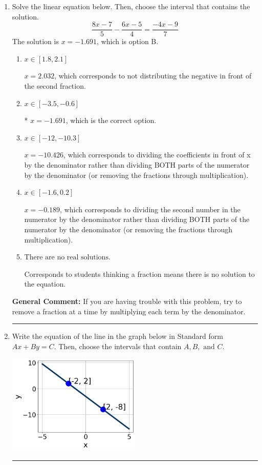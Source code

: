 \documentclass{extbook}[14pt]
\newcommand{\litem}[1]{\item #1

\rule{\textwidth}{0.4pt}}
\begin{document}
\begin{enumerate}\litem{
Solve the linear equation below. Then, choose the interval that contains the solution.
\[ \frac{8x -7}{5} - \frac{6x -5}{4} = \frac{-4x -9}{7} \]The solution is \( x = -1.691 \), which is option B.\begin{enumerate}[label=\Alph*.]
\item \( x \in [1.8, 2.1] \)

 $x = 2.032$, which corresponds to not distributing the negative in front of the second fraction.
\item \( x \in [-3.5, -0.6] \)

* $x = -1.691$, which is the correct option.
\item \( x \in [-12, -10.3] \)

 $x = -10.426$, which corresponds to dividing the coefficients in front of x by the denominator rather than dividing BOTH parts of the numerator by the denominator (or removing the fractions through multiplication).
\item \( x \in [-1.6, 0.2] \)

 $x = -0.189$, which corresponds to dividing the second number in the numerator by the denominator rather than dividing BOTH parts of the numerator by the denominator (or removing the fractions through multiplication).
\item \( \text{There are no real solutions.} \)

Corresponds to students thinking a fraction means there is no solution to the equation.
\end{enumerate}

\textbf{General Comment:} If you are having trouble with this problem, try to remove a fraction at a time by multiplying each term by the denominator.
}
\litem{
Write the equation of the line in the graph below in Standard form $Ax+By=C$. Then, choose the intervals that contain $A, B, \text{ and } C$.

\begin{center}
    \includegraphics[width=0.5\textwidth]{../Figures/linearGraphToStandardB.png}
\end{center}


}
\end{enumerate}
\end{document}
